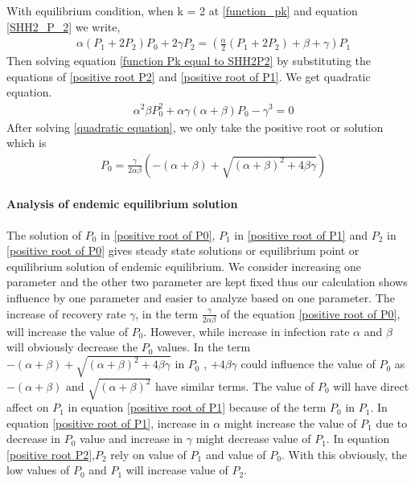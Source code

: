 \documentclass[paper=a4, fontsize=11pt, twoside, BCOR=12mm, parskip=full, listof=totoc]{scrreprt}
\begin{document}
{With equilibrium condition, when k = 2 at \ref{function_pk} and equation \ref{SHH2_P_2} we write,   
\begin{equation}
\label{function Pk equal to SHH2P2} 
	\begin{aligned}
	&\alpha ( P_1 + 2 P_2 ) P_0 + 2 \gamma P_2  = (\frac{\alpha}{2}( P_1 + 2 P_2 ) + \beta +\gamma)P_1
	\end{aligned}
\end{equation}
Then solving equation \ref{function Pk equal to SHH2P2} by substituting the equations of \ref{positive root P2} and \ref{positive root of P1}.
We get quadratic equation.  
\begin{equation}
\label{quadratic equation}
	\begin{aligned}
	&\alpha^2 \beta P_0^2 + \alpha \gamma (\alpha + \beta)P_0 - \gamma^3  = 0
	\end{aligned}
\end{equation}
After solving \ref{quadratic equation}, we only take the positive root or solution which is  	
\begin{equation}
\label{positive root of P0}
	\begin{aligned}
		&P_0 = \frac{\gamma}{2\alpha\beta}(-( \alpha + \beta ) + \sqrt{( \alpha + \beta )^2 + 4\beta\gamma})
	\end{aligned}
\end{equation}	 

\paragraph*{Analysis of endemic equilibrium solution}

The solution of $ P_0 $ in \ref{positive root of P0}, $ P_1 $ in \ref{positive root of P1} and $P_2$ in \ref{positive root of P0} gives steady state solutions or equilibrium point or equilibrium solution of endemic equilibrium. We consider increasing one parameter and the other two parameter are kept fixed thus our calculation shows influence by one parameter and easier to analyze based on one parameter. The increase of recovery rate $\gamma$, in the term $\frac{\gamma}{2\alpha\beta}$ of the equation \ref{positive root of P0}, will increase the value of $P_0$.  However, while increase in infection rate $\alpha$ and $\beta$ will obviously decrease the $P_0$ values. In the term \(-(\alpha + \beta) + \sqrt{( \alpha + \beta )^2 + 4\beta\gamma} \) in $P_0$ , $+ 4\beta\gamma$ could influence the value of $P_0$ as \(-(\alpha + \beta) \mbox{ and } \sqrt{( \alpha + \beta )^2} \) have similar terms. The value of $P_0$ will have direct affect on $P_1$ in equation \ref{positive root of P1} because of the term $P_0$ in $P_1$. In equation \ref{positive root of P1}, increase in $\alpha$ might increase the value of $P_1$ due to decrease in $P_0$ value and increase in $\gamma$ might decrease value of $P_1$. In equation \ref{positive root P2},$P_2$ rely on value of $P_1$ and value of $P_0$. With this obviously, the low values of $P_0$ and $P_1$ will increase value of $P_2$.
        
}
\end{document}
